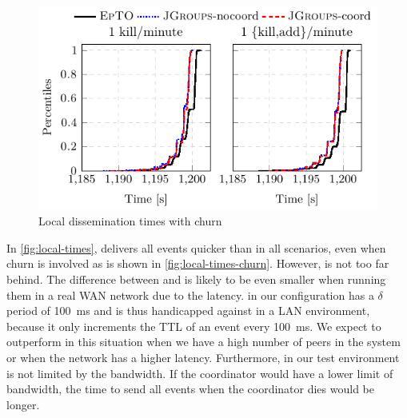  \begin{figure}[hpt]
 	\centering
 	\includegraphics[width=\linewidth]{figures/local-times-synth-churn.pdf}
 	\vspace{-2mm} 
 	\caption{Local dissemination times with churn}
 	\vspace{-2mm} 
 	\label{fig:local-times-churn} 
 \end{figure}
In \autoref{fig:local-times}, \jgroups delivers all events quicker than \epto in all scenarios, even when churn is involved as is shown in \autoref{fig:local-times-churn}. However, \epto is not too far behind. The difference between \epto and \jgroups is likely to be even smaller when running them in a real WAN network due to the latency. \epto in our configuration has a $\delta$ period of \SI{100}{\milli\second} and is thus handicapped against \jgroups in a LAN environment, because it only increments the TTL of an event every \SI{100}{\milli\second}. We expect \epto to outperform \jgroups in this situation when we have a high number of peers in the system or when the network has a higher latency. Furthermore, in our test environment \jgroups is not limited by the bandwidth. If the coordinator would have a lower limit of bandwidth, the time to send all events when the coordinator dies would be longer. 
